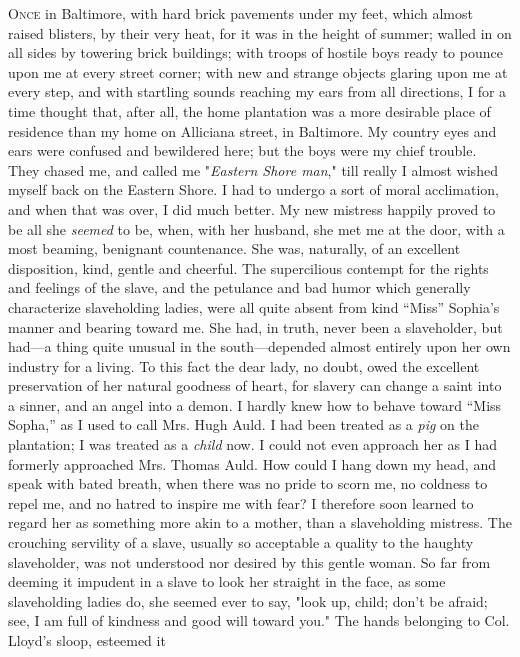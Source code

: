 \textsc{Once} in Baltimore, with hard brick pavements under my feet,
which almost raised blisters, by their very heat, for it was in the
height of summer; walled in on all sides by towering brick buildings;
with troops of hostile boys ready to pounce upon me at every street
corner; with new and strange objects glaring upon me at every step, and
with startling sounds reaching my ears from all directions, I for a time
thought that, after all, the home plantation was a more desirable place
of residence than my home on Alliciana street, in Baltimore. My country
eyes and ears were confused and bewildered here; but the boys were my
chief trouble. They chased me, and called me "\emph{Eastern Shore man},"
till really I almost wished myself back on the Eastern Shore. I had to
undergo a sort {}of moral acclimation, and when that was over, I did
much better. My new mistress happily proved to be all she \emph{seemed}
to be, when, with her husband, she met me at the door, with a most
beaming, benignant countenance. She was, naturally, of an excellent
disposition, kind, gentle and cheerful. The supercilious contempt for
the rights and feelings of the slave, and the petulance and bad humor
which generally characterize slaveholding ladies, were all quite absent
from kind ``Miss'' Sophia's manner and bearing toward me. She had, in
truth, never been a slaveholder, but had---a thing quite unusual in the
south---depended almost entirely upon her own industry for a living. To
this fact the dear lady, no doubt, owed the excellent preservation of
her natural goodness of heart, for slavery can change a saint into a
sinner, and an angel into a demon. I hardly knew how to behave toward
``Miss Sopha,'' as I used to call Mrs. Hugh Auld. I had been treated as
a \emph{pig} on the plantation; I was treated as a \emph{child} now. I
could not even approach her as I had formerly approached Mrs. Thomas
Auld. How could I hang down my head, and speak with bated breath, when
there was no pride to scorn me, no coldness to repel me, and no hatred
to inspire me with fear? I therefore soon learned to regard her as
something more akin to a mother, than a slaveholding mistress. The
crouching servility of a slave, usually so acceptable a quality to the
haughty slaveholder, was not understood nor desired by this gentle
woman. So far from deeming it impudent in a slave to look her straight
in the face, as some slaveholding ladies do, she seemed ever to say,
"look up, {}child; don't be afraid; see, I am full of kindness and good
will toward you." The hands belonging to Col. Lloyd's sloop, esteemed it
